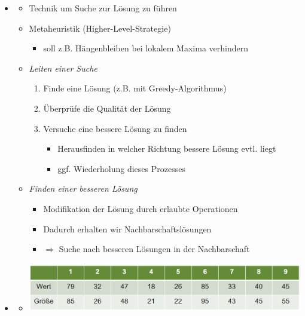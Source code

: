 \documentclass[
    12pt,
    a4paper,
    ngerman,
    color=3b,%
    marginpar=false,
    colorback=false,
    leqno,
]{tudaexercise}
\begin{document}
\begin{itemize}
        \item {}
            \begin{itemize}
                \item Technik um Suche zur Lösung zu führen
                \item Metaheuristik (Higher-Level-Strategie)
                    \begin{itemize}
                        \item soll z.B. Hängenbleiben bei lokalem Maxima verhindern
                    \end{itemize}
                \item \textit{Leiten einer Suche}
                    \begin{enumerate}
                        \item Finde eine Lösung (z.B. mit Greedy-Algorithmus)
                        \item Überprüfe die Qualität der Lösung
                        \item Versuche eine bessere Lösung zu finden
                            \begin{itemize}
                                \item Herausfinden in welcher Richtung bessere Lösung evtl. liegt
                                \item ggf. Wiederholung dieses Prozesses
                            \end{itemize}
                    \end{enumerate}
                \item \textit{Finden einer besseren Lösung}
                    \begin{itemize}
                        \item Modifikation der Lösung durch erlaubte Operationen
                        \item Dadurch erhalten wir Nachbarschaftslösungen
                        \item[] $\Rightarrow$ Suche nach besseren Lösungen in der Nachbarschaft
                    \end{itemize}
            \end{itemize}
        \clearpage
        \item {}
            \begin{itemize}
                \item[] \includegraphics[width=12cm]{pictures/rucksack1.PNG}

\end{itemize}
\end{itemize}
\end{document}
